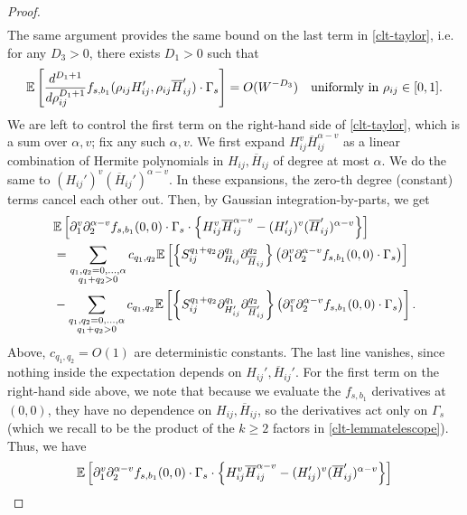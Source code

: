 \begin{proof}
\begin{align}
\end{align}
%
The same argument provides the same bound on the last term in \eqref{clt-taylor}, i.e. for any $D_{3}>0$, there exists $D_{1}>0$ such that 
%
\begin{align}
\mathbb{E}\left[\frac{d^{D_{1}+1}}{d\rho_{ij}^{D_{1}+1}}f_{s,b_{1}}(\rho_{ij}H'_{ij},\rho_{ij}\overline{H}'_{ij})\cdot\Gamma_{s}\right]=O(W^{-D_{3}})\quad\text{uniformly in }\rho_{ij}\in[0,1].\label{clt-remainder-bound-same}
\end{align}
%
We are left to control the first term on the right-hand side of \eqref{clt-taylor}, which is a sum over $\alpha,v$; fix any such $\alpha,v$. We first expand $H_{ij}^{v}\overline{H}_{ij}^{\alpha-v}$ as a linear combination of Hermite polynomials in $H_{ij},\overline{H}_{ij}$ of degree at most $\alpha$. We do the same to $(H_{ij}')^{v}(\overline{H}_{ij}')^{\alpha-v}$. In these expansions, the zero-th degree (constant) terms cancel each other out. Then, by Gaussian integration-by-parts, we get
%
\begin{align}
&\mathbb{E}\left[\partial_{1}^{v}\partial_{2}^{\alpha-v}f_{s,b_{1}}(0,0)\cdot\Gamma_{s}\cdot\left\{H_{ij}^{v}\overline{H}_{ij}^{\alpha-v}-(H_{ij}')^{v}(\overline{H}_{ij}')^{\alpha-v}\right\}\right]\\
&=\sum_{\substack{q_{1},q_{2}=0,\ldots,\alpha\\q_{1}+q_{2}>0}}c_{q_{1},q_{2}}\mathbb{E}\left[\left\{S_{ij}^{q_{1}+q_{2}}\partial_{H_{ij}}^{q_{1}}\partial_{\overline{H}_{ij}}^{q_{2}}\right\}\left(\partial_{1}^{v}\partial_{2}^{\alpha-v}f_{s,b_{1}}(0,0)\cdot\Gamma_{s}\right)\right]\\
&-\sum_{\substack{q_{1},q_{2}=0,\ldots,\alpha\\q_{1}+q_{2}>0}}c_{q_{1},q_{2}}\mathbb{E}\left[\left\{S_{ij}^{q_{1}+q_{2}}\partial_{H_{ij}'}^{q_{1}}\partial_{\overline{H}_{ij}'}^{q_{2}}\right\}\left(\partial_{1}^{v}\partial_{2}^{\alpha-v}f_{s,b_{1}}(0,0)\cdot\Gamma_{s}\right)\right].
\end{align}
%
Above, $c_{q_{1},q_{2}}=O(1)$ are deterministic constants. The last line vanishes, since nothing inside the expectation depends on $H_{ij}',\overline{H}_{ij}'$. For the first term on the right-hand side above, we note that because we evaluate the $f_{s,b_{1}}$ derivatives at $(0,0)$, they have no dependence on $H_{ij},\overline{H}_{ij}$, so the derivatives act only on $\Gamma_{s}$ (which we recall to be the product of the $k\geq2$ factors in \eqref{clt-lemmatelescope}). Thus, we have 
%
\begin{align}
&\E\left[\partial_{1}^{v}\partial_{2}^{\alpha-v}f_{s,b_{1}}(0,0)\cdot\Gamma_{s}\cdot\left\{H_{ij}^{v}\overline{H}_{ij}^{\alpha-v}-(H_{ij}')^{v}(\overline{H}_{ij}')^{\alpha-v}\right\}\right]\nonumber\\

\end{align}
\end{proof}
